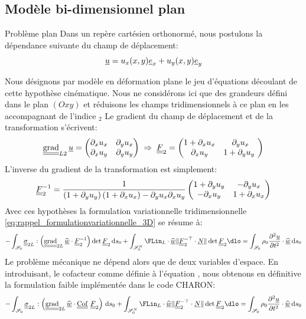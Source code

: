 \documentclass[10pt]{book}
\begin{document}
\subsection{Modèle bi-dimensionnel plan}\label{Subsection:Modèle bi-dimensionnel plan}
\begin{Hypothese}{Problème plan} Dans un repère cartésien orthonormé, nous postulons la dépendance suivante du champ de déplacement:
$$\underline{u}=u_{x}(x,y)\underline{e}_{x}+u_{y}(x,y)\underline{e}_{y}$$
\end{Hypothese}
Nous désignons par \og modèle en déformation plane \fg{} le jeu d'équations découlant de cette hypothèse cinématique. Nous ne considérons ici que des grandeurs défini dans le plan $(Oxy)$ et réduisons les champs tridimensionnels à ce plan en les accompagnant de l'indice \og $_{2}$ \fg{} Le gradient du champ de déplacement et de la transformation s'écrivent:
$$\tgrad_{L2}\Dep=\begin{pmatrix}
\partial_{x}u_{x} & \partial_{y}u_{x}\\
\partial_{x}u_{y}  & \partial_{y}u_{y}\\
\end{pmatrix} \implique \GT_{2} = \begin{pmatrix}
1+\partial_{x}u_{x} & \partial_{y}u_{x}\\
\partial_{x}u_{y}  & 1+\partial_{y}u_{y}\
\end{pmatrix}$$
L'inverse du gradient de la transformation est simplement:
$$\underline{\underline{F}}_{2}^{-1} = \dfrac{1}{\left(1+\partial_{y}u_{y}\right)\left(1+\partial_{x}u_{x}\right)-\partial_{y}u_{x}\partial_{x}u_{y}}\begin{pmatrix}
1+\partial_{y}u_{y} & -\partial_{y}u_{x}\\
-\partial_{x}u_{y} & 1+\partial_{x}u_{x}\\
\end{pmatrix}$$
Avec ces hypothèses la formulation variationnelle tridimensionnelle \eqref{eq:rappel_formulationvariationnelle_3D} se résume à:
$$-\int_{\mathscr{S}_{0}}\SC_{2L}:\left(\tgrad_{2L}\DepVirt\cdot\GT_{2}^{-1}\right)\det\GT_{2}\dso+\int_{\mathscr{S}_{0}^{N}}\FLin_{L}\cdot\DepVirt\Vert\GT^{-\top}_{2}\cdot\NormaleInit\Vert\det\GT_{2}\dlo=\int_{\mathscr{S}_{0}}\rho_{0}\dfrac{\partial^{2}\Dep}{\partial t^{2}}\cdot\DepVirt\dso$$
Le problème mécanique ne dépend alors que de deux variables d'espace. En introduisant, le cofacteur comme définie à l'équation \eref{eq:defo_conjug_cofac}, nous obtenons en définitive la formulation faible implémentée dans le code CHARON:
\begin{equation}
-\int_{\mathscr{S}_{0}}\SC_{2L}:\left(\tgrad_{2L}\DepVirt\cdot\Cof\GT_{2}\right)\dso+\int_{\mathscr{S}_{0}^{N}}\FLin_{L}\cdot\DepVirt\Vert\GT^{-\top}_{2}\cdot\NormaleInit\Vert\det\GT_{2}\dlo=\int_{\mathscr{S}_{0}}\rho_{0}\dfrac{\partial^{2}\Dep}{\partial t^{2}}\cdot\DepVirt\dso
\label{eq:rappel_formulationvariationnelle_2D_plan}
\end{equation}
\end{document}
